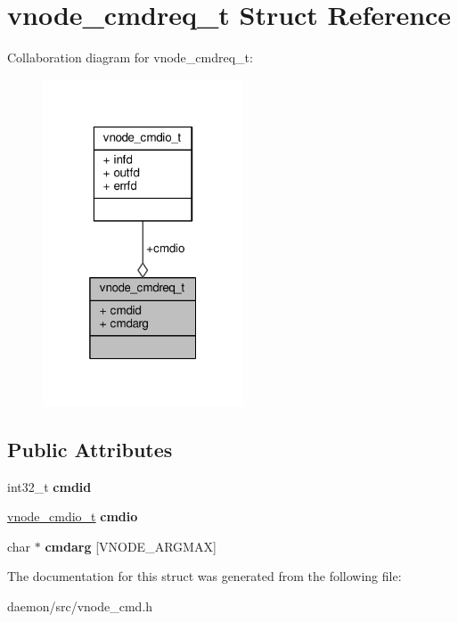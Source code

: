 \hypertarget{structvnode__cmdreq__t}{\section{vnode\+\_\+cmdreq\+\_\+t Struct Reference}
\label{structvnode__cmdreq__t}
}


Collaboration diagram for vnode\+\_\+cmdreq\+\_\+t\+:
\nopagebreak
\begin{figure}[H]
\begin{center}
\leavevmode
\includegraphics[width=169pt]{structvnode__cmdreq__t__coll__graph}
\end{center}
\end{figure}
\subsection*{Public Attributes}
\begin{DoxyCompactItemize}
\item 
\hypertarget{structvnode__cmdreq__t_ac6a1f579a9b2e96f769f8eb72438d6e1}{int32\+\_\+t {\bfseries cmdid}}\label{structvnode__cmdreq__t_ac6a1f579a9b2e96f769f8eb72438d6e1}

\item 
\hypertarget{structvnode__cmdreq__t_a6d9aea122ca26a7296e457743122c644}{\hyperlink{structvnode__cmdio__t}{vnode\+\_\+cmdio\+\_\+t} {\bfseries cmdio}}\label{structvnode__cmdreq__t_a6d9aea122ca26a7296e457743122c644}

\item 
\hypertarget{structvnode__cmdreq__t_ae9898052f7a485125d5b380689d3a232}{char $\ast$ {\bfseries cmdarg} \mbox{[}V\+N\+O\+D\+E\+\_\+\+A\+R\+G\+M\+A\+X\mbox{]}}\label{structvnode__cmdreq__t_ae9898052f7a485125d5b380689d3a232}

\end{DoxyCompactItemize}


The documentation for this struct was generated from the following file\+:\begin{DoxyCompactItemize}
\item 
daemon/src/vnode\+\_\+cmd.\+h\end{DoxyCompactItemize}
